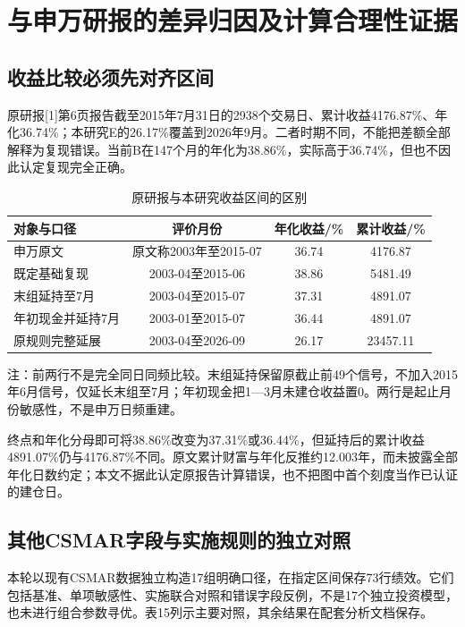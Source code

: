 
\chapter{与申万研报的差异归因及计算合理性证据}
\section{收益比较必须先对齐区间}
原研报[1]第6页报告截至2015年7月31日的2938个交易日、累计收益4176.87\%、年化36.74\%；本研究E的26.17\%覆盖到2026年9月。二者时期不同，不能把差额全部解释为复现错误。当前B在147个月的年化为38.86\%，实际高于36.74\%，但也不因此认定复现完全正确。

\begin{table}[htbp]
\centering
\caption{原研报与本研究收益区间的区别}
\renewcommand{\arraystretch}{1.18}
\small
\setlength{\tabcolsep}{4.5pt}
\begin{tabularx}{\textwidth}{@{}p{2.9cm}*{3}{C}@{}}
\toprule
对象与口径 & 评价月份 & 年化收益/\% & 累计收益/\% \\
\midrule
申万原文 & 原文称2003年至2015-07 & 36.74 & 4176.87 \\
既定基础复现 & 2003-04至2015-06 & 38.86 & 5481.49 \\
末组延持至7月 & 2003-04至2015-07 & 37.31 & 4891.07 \\
年初现金并延持7月 & 2003-01至2015-07 & 36.44 & 4891.07 \\
原规则完整延展 & 2003-04至2026-09 & 26.17 & 23457.11 \\
\bottomrule
\end{tabularx}
\par\smallskip
\begin{minipage}{\textwidth}\small 注：前两行不是完全同日同频比较。末组延持保留原截止前49个信号，不加入2015年6月信号，仅延长末组至7月；年初现金把1—3月未建仓收益置0。两行是起止月份敏感性，不是申万日频重建。\end{minipage}
\end{table}

终点和年化分母即可将38.86\%改变为37.31\%或36.44\%，但延持后的累计收益4891.07\%仍与4176.87\%不同。原文累计财富与年化反推约12.003年，而未披露全部年化日数约定；本文不据此认定原报告计算错误，也不把图中首个刻度当作已认证的建仓日。

\section{其他CSMAR字段与实施规则的独立对照}
本轮以现有CSMAR数据独立构造17组明确口径，在指定区间保存73行绩效。它们包括基准、单项敏感性、实施联合对照和错误字段反例，不是17个独立投资模型，也未进行组合参数寻优。表15列示主要对照，其余结果在配套分析文档保存。

